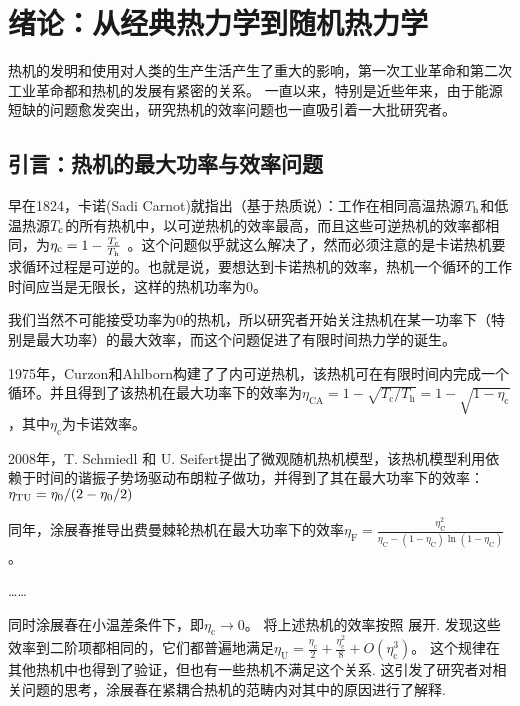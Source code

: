 \chapter{绪论：从经典热力学到随机热力学}
\label{c1}
热机的发明和使用对人类的生产生活产生了重大的影响，第一次工业革命和第二次工业革命都和热机的发展有紧密的关系。 一直以来，特别是近些年来，由于能源短缺的问题愈发突出，研究热机的效率问题也一直吸引着一大批研究者。

\section{引言：热机的最大功率与效率问题}
\qquad 早在1824，卡诺(Sadi Carnot)就指出（基于热质说）\cite{2005}：工作在相同高温热源$T_{\mathrm{h}}$和低温热源$T_{\mathrm{c}}$的所有热机中，以可逆热机的效率最高，而且这些可逆热机的效率都相同，为$\eta _{\text{c}}=1-\frac{T_{\mathrm{c}}}{T_{\mathrm{h}}}$ 。这个问题似乎就这么解决了，然而必须注意的是卡诺热机要求循环过程是可逆的。也就是说，要想达到卡诺热机的效率，热机一个循环的工作时间应当是无限长，这样的热机功率为0。

我们当然不可能接受功率为0的热机，所以研究者开始关注热机在某一功率下（特别是最大功率）的最大效率，而这个问题促进了有限时间热力学的诞生。

1975年，Curzon和Ahlborn构建了了内可逆热机\cite{Curzon1975}，该热机可在有限时间内完成一个循环。并且得到了该热机在最大功率下的效率为$\eta _{\mathrm{CA}}=1-\sqrt{T_{\mathrm{c}}/T_{\mathrm{h}}}=1-\sqrt{1-\eta _{\mathrm{c}}}$ ，其中$\eta _{\mathrm{c}}$为卡诺效率。

2008年，T. Schmiedl 和 U. Seifert提出了微观随机热机模型\cite{Schmiedl2008}，该热机模型利用依赖于时间的谐振子势场驱动布朗粒子做功，并得到了其在最大功率下的效率：$\eta_{\mathrm{TU}}={ \eta_{0}}/{(2-\eta_{0}/2)}$

同年，涂展春推导出费曼棘轮热机\cite{Tu2008}在最大功率下的效率$\eta _{\text{F}}=\frac{\eta _{\text{C}}^{2}}{\eta _{\text{C}}-\left( 1-\eta _{\text{C}} \right) \ln \left( 1-\eta _{\text{C}} \right)}$。 \cite{Tu2020}

……

同时涂展春\cite{Tu2008}在小温差条件下，即$\eta _{\text{c}}\rightarrow 0$。 将上述热机的效率按照 展开. 发现这些效率到二阶项都相同的，它们都普遍地满足$\eta _{\text{U}}=\frac{\eta _{\text{c}}}{2}+\frac{\eta _{\text{c}}^{2}}{8}+O\left( \eta _{\text{c}}^{3} \right)$。 这个规律在其他热机中也得到了验证，但也有一些热机不满足这个关系. 这引发了研究者对相关问题的思考，涂展春在紧耦合热机的范畴内对其中的原因进行了解释.\cite{Tu2020}

